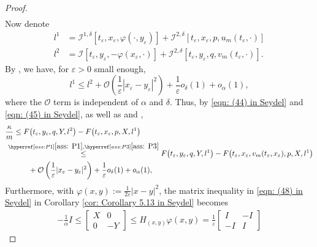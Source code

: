 \begin{proof}
\begin{align*}
    \end{align*}
    Now denote 
    \begin{align*}
        l^1 &= \mathcal{I}^{1,\delta}[t_\varepsilon,x_\varepsilon,\varphi(\cdot, y_\varepsilon)] + \mathcal{I}^{2,\delta}[t_\varepsilon,x_\varepsilon,p,u_m(t_\varepsilon, \cdot)] \\
        l^2 &=\mathcal{I}[t_\varepsilon,y_\varepsilon,-\varphi(x_\varepsilon,\cdot)] + \mathcal{I}^{2,\delta} [t_\varepsilon,y_\varepsilon,q,v_m(t_\varepsilon,\cdot)].
    \end{align*}
    By , we have, for $\varepsilon>0$ small enough,
    \begin{equation*}
        l^1 \leq l^2 + \mathcal{O}\left( \frac{1}{\varepsilon} |x_\varepsilon-y_\varepsilon|^2\right) + \frac{1}{\varepsilon}o_\delta(1)+o_\alpha(1),
    \end{equation*}
    where the $\mathcal{O}$ term is independent of $\alpha$ and $\delta$. Thus, by \eqref{eqn: (44) in Seydel} and \eqref{eqn: (45) in Seydel}, as well as  and , 
    \begin{align*}
        \frac{\kappa}{m} &\leq F\big(t_\varepsilon, y_\varepsilon, q, Y, l^2 \big) - F\big(t_\varepsilon, x_\varepsilon, p, X, l^1 \big) \\
        & \hspace{-1em} \overset{\assitemref{ass: P1},\assitemref{ass: P3}}{\leq} F\big(t_\varepsilon, y_\varepsilon, q, Y, l^1 \big) - F\big(t_\varepsilon, x_\varepsilon, v_m(t_\varepsilon,x_\varepsilon), p, X, l^1 \big) \\
        & \qquad + \mathcal{O}\left( \frac{1}{\varepsilon} |x_\varepsilon-y_\varepsilon|^2 \right)+ \frac{1}{\varepsilon} o_\delta(1) + o_\alpha(1),
    \end{align*}
    Furthermore, with $\varphi(x,y) := \frac{1}{2\varepsilon}|x-y|^2$, the matrix inequality in \eqref{eqn: (48) in Seydel} in Corollary \ref{cor: Corollary 5.13 in Seydel} becomes
    \begin{align*}
        -\frac{1}{\alpha} I \leq 
        \begin{bmatrix}
            X & 0 \\
            0 & -Y
        \end{bmatrix}
        \leq H_{(x,y)} \varphi(x,y) = \frac{1}{\varepsilon} 
        \begin{bmatrix}
            I & -I \\
            -I & I
        \end{bmatrix}

\end{align*}
\end{proof}

